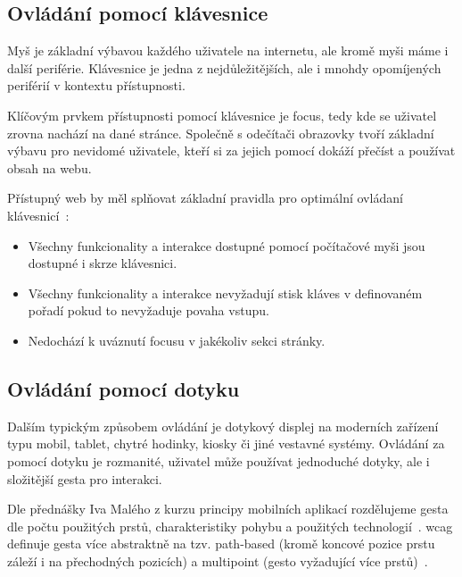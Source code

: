 \subsection{Ovládání pomocí klávesnice}

Myš je základní výbavou každého uživatele na internetu, ale kromě myši máme i další periférie.
Klávesnice je jedna z nejdůležitějších, ale i mnohdy opomíjených periférií v kontextu přístupnosti.


Klíčovým prvkem přístupnosti pomocí klávesnice je focus, tedy kde se uživatel zrovna nachází na dané stránce.
Společně s odečítači obrazovky tvoří základní výbavu pro nevidomé uživatele, kteří si za jejich pomocí dokáží přečíst a používat obsah na webu.

Přístupný web by měl splňovat základní pravidla pro optimální ovládaní klávesnicí~\cite{wcag-keyboard}:

\begin{itemize}
  \item Všechny funkcionality a interakce dostupné pomocí počítačové myši jsou dostupné i skrze klávesnici.
  \item Všechny funkcionality a interakce nevyžadují stisk kláves v definovaném pořadí pokud to nevyžaduje povaha vstupu.
  \item Nedochází k uváznutí focusu v jakékoliv sekci stránky.
\end{itemize}

\subsection{Ovládání pomocí dotyku}

Dalším typickým způsobem ovládání je dotykový displej na moderních zařízení typu mobil, tablet, chytré hodinky, kiosky či jiné vestavné systémy.
Ovládání za pomocí dotyku je rozmanité, uživatel může používat jednoduché dotyky, ale i složitější gesta pro interakci.


Dle přednášky Iva Malého z kurzu principy mobilních aplikací rozdělujeme gesta dle počtu použitých prstů, charakteristiky pohybu a použitých technologií~\cite{ctu-pda-11}.
\gls{wcag} definuje gesta více abstraktně na tzv. path-based (kromě koncové pozice prstu záleží i na přechodných pozicích) a multipoint (gesto vyžadující více prstů)~\cite{wcag-pointer-gestures}.

